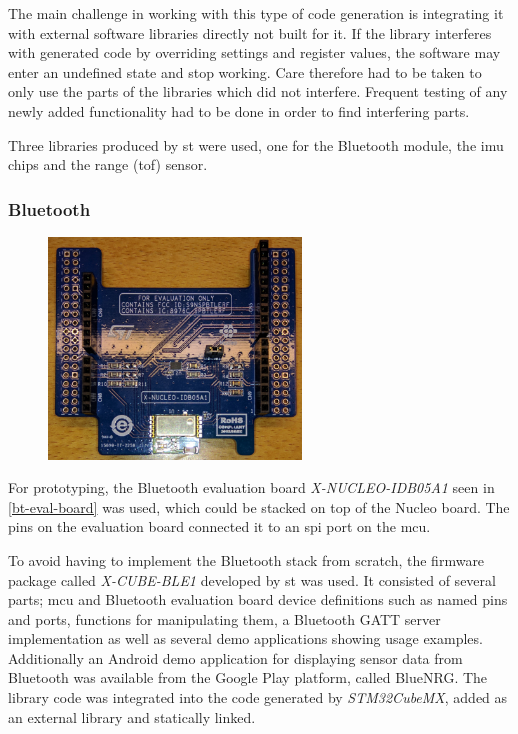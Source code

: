 The main challenge in working with this type of code generation is integrating it with external software libraries directly not built for it. If the library interferes with generated code by overriding settings and register values, the software may enter an undefined state and stop working. Care therefore had to be taken to only use the parts of the libraries which did not interfere. Frequent testing of any newly added functionality had to be done in order to find interfering parts.

Three libraries produced by \gls{st} were used, one for the Bluetooth module, the \gls{imu} chips and the range (\gls{tof}) sensor.

\subsubsection{Bluetooth}\label{bluetooth}
\begin{figure}[H]
\centering
\includegraphics[width=0.6\textwidth]{Figures/x-nucleo-idb05a1.jpg}
\label{bt-eval-board}
\end{figure}

For prototyping, the Bluetooth evaluation board \emph{X-NUCLEO-IDB05A1}\cite{x-nucleo-idb05a1} seen in \autoref{bt-eval-board} was used, which could be stacked on top of the Nucleo board. The pins on the evaluation board connected it to an \gls{spi} port on the \gls{mcu}.

To avoid having to implement the Bluetooth stack from scratch, the firmware package called \emph{X-CUBE-BLE1}\cite{x-cube-ble1} developed by \gls{st} was used. It consisted of several parts; \gls{mcu} and Bluetooth evaluation board device definitions such as named pins and ports, functions for manipulating them, a Bluetooth GATT server implementation as well as several demo applications showing usage examples. Additionally an Android demo application for displaying sensor data from Bluetooth was available from the Google Play platform, called BlueNRG\cite{bluenrg-app}. The library code was integrated into the code generated by \emph{STM32CubeMX}, added as an external library and statically linked.

